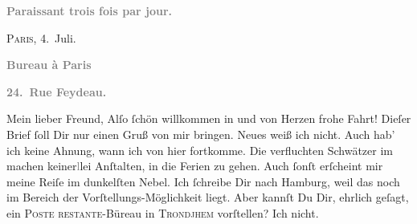 \begin{ledgroupsized}[t]{13cm}
           \pstart
           \begin{otherlanguage}{french}\textcolor{gray}{\textbf{\textbf{Paraissant trois fois par jour.}}}\end{otherlanguage}\hfill \textsc{Paris}, 4. Juli.\pend
           \pstart
           \begin{otherlanguage}{french}\textcolor{gray}{\textbf{\textbf{Bureau à Paris}}}\end{otherlanguage}\pend
           \pstart
           \begin{otherlanguage}{french}\textcolor{gray}{\textbf{\textbf{24. Rue Feydeau.}}}\end{otherlanguage}\pend
           \pstart\center{}Mein lieber Freund,\pend\pstart
           Alſo ſchön willkommen in \label{K_L02780-1v}\label{K_L02780-1h} und von Herzen frohe
               Fahrt!\pend
           \pstart
           Dieſer Brief ſoll Dir nur einen Gruß von mir \strikeout{\textcolor{gray}{×}\-\textcolor{gray}{×}\-\textcolor{gray}{×}} bringen.\pend
           \pstart
           Neues weiß ich nicht.\pend
           \pstart
           Auch hab’ ich keine Ahnung, wann ich von hier fortkomme. Die verfluchten Schwätzer im
                  {\pb}\label{K_L02780-2v}\label{K_L02780-2h} machen keiner\textcolor{gray}{l}lei Anſtalten, in die Ferien zu gehen. Auch
               ſonſt erſcheint mir meine Reiſe im dunkelſten Nebel.\pend
           \pstart
           Ich ſchreibe Dir  nach Hamburg,
               weil das noch im Bereich der Vorſtellungs-Möglichkeit liegt. Aber kannſt Du Dir,
               ehrlich geſagt, ein \textsc{Poste restante}-Büreau in \textsc{Trondjhem} vorſtellen? Ich nicht.\pend

\end{ledgroupsized}
